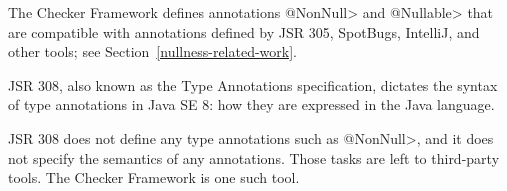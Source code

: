 The Checker Framework defines annotations \<@NonNull> and \<@Nullable> that
are compatible with annotations defined by JSR 305, SpotBugs, IntelliJ, and
other tools; see Section~\ref{nullness-related-work}.



JSR 308, also known as the Type Annotations specification, dictates the
syntax of type annotations in Java SE 8:  how they are expressed in the
Java language.

JSR 308 does not define any type annotations such as \<@NonNull>, and it does
not specify the semantics of any annotations.  Those tasks are left to
third-party tools.  The Checker Framework is one such tool.



